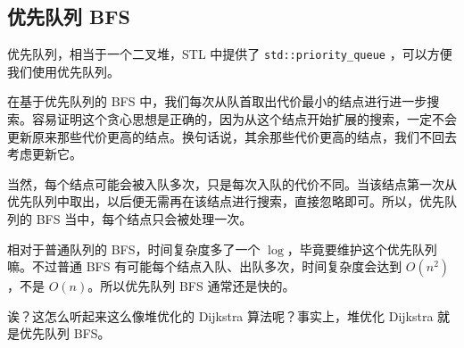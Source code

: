 \subsection{优先队列 BFS}

优先队列，相当于一个二叉堆，STL 中提供了  \texttt{std::priority\_queue} ，可以方便我们使用优先队列。

在基于优先队列的 BFS 中，我们每次从队首取出代价最小的结点进行进一步搜索。容易证明这个贪心思想是正确的，因为从这个结点开始扩展的搜索，一定不会更新原来那些代价更高的结点。换句话说，其余那些代价更高的结点，我们不回去考虑更新它。

当然，每个结点可能会被入队多次，只是每次入队的代价不同。当该结点第一次从优先队列中取出，以后便无需再在该结点进行搜索，直接忽略即可。所以，优先队列的 BFS 当中，每个结点只会被处理一次。

相对于普通队列的 BFS，时间复杂度多了一个 $\log$，毕竟要维护这个优先队列嘛。不过普通 BFS 有可能每个结点入队、出队多次，时间复杂度会达到 $O(n^2)$，不是 $O(n)$。所以优先队列 BFS 通常还是快的。

诶？这怎么听起来这么像堆优化的  Dijkstra  算法呢？事实上，堆优化 Dijkstra 就是优先队列 BFS。
